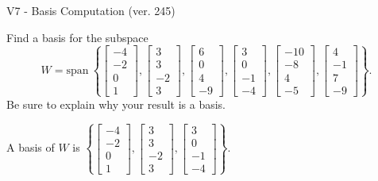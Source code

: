 \begin{exercise}
  \begin{exerciseTitle}V7 - Basis Computation (ver. 245)\end{exerciseTitle}
  \begin{exerciseStatement}
    Find a basis for the subspace 
\[W=\mathrm{span}\ \left\{\left[\begin{array}{r}
-4 \\
-2 \\
0 \\
1
\end{array}\right] , \left[\begin{array}{r}
3 \\
3 \\
-2 \\
3
\end{array}\right] , \left[\begin{array}{r}
6 \\
0 \\
4 \\
-9
\end{array}\right] , \left[\begin{array}{r}
3 \\
0 \\
-1 \\
-4
\end{array}\right] , \left[\begin{array}{r}
-10 \\
-8 \\
4 \\
-5
\end{array}\right] , \left[\begin{array}{r}
4 \\
-1 \\
7 \\
-9
\end{array}\right]\right\}.\]
 Be sure to explain why your result is a basis.


  \end{exerciseStatement}
  \begin{exerciseAnswer}
   A basis of \(W\) is  \(\left\{\left[\begin{array}{r}
-4 \\
-2 \\
0 \\
1
\end{array}\right] , \left[\begin{array}{r}
3 \\
3 \\
-2 \\
3
\end{array}\right] , \left[\begin{array}{r}
3 \\
0 \\
-1 \\
-4
\end{array}\right]\right\}\).
  


  \end{exerciseAnswer}
\end{exercise}